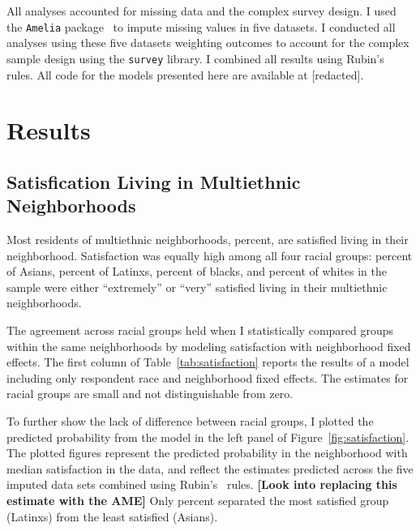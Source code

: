 \documentclass{baderart}
\begin{document}
All analyses accounted for missing data and the complex survey design. I used the \texttt{Amelia} package~\citep{honaker_amelia_2011} to impute missing values in five datasets. I conducted all analyses using these five datasets weighting outcomes to account for the complex sample design using the \texttt{survey} library. I combined all results using Rubin's~\citeyearpar{rubin_multiple_2004} rules. All code for the models presented here are available at [redacted].

\section{Results}\label{results}

\subsection{Satisfication Living in Multiethnic Neighborhoods}\label{satisfication-living-in-multiethnic-neighborhoods}

Most residents of multiethnic neighborhoods, \meansatisfied percent, are satisfied living in their neighborhood. Satisfaction was equally high among all four racial groups: \apisatisfied percent of Asians, \hspsatisfied percent of Latinxs, \nhbsatisfied percent of blacks, and \nhwsatisfied percent of whites in the sample were either ``extremely'' or ``very'' satisfied living in their multiethnic neighborhoods.

The agreement across racial groups held when I statistically compared groups within the same neighborhoods by modeling satisfaction with neighborhood fixed effects. The first column of Table~\ref{tab:satisfaction} reports the results of a model including only respondent race and neighborhood fixed effects. The estimates for racial groups are small and not distinguishable from zero.



To further show the lack of difference between racial groups, I plotted the predicted probability from the model in the left panel of Figure~\ref{fig:satisfaction}. The plotted figures represent the predicted probability in the neighborhood with median satisfaction in the data, and reflect the estimates predicted across the five imputed data sets combined using Rubin's~\citep{rubin_multiple_2004} rules. \textbf{{[}Look into replacing this estimate with the AME{]}} Only \maxdiffone percent separated the most satisfied group (Latinxs) from the least satisfied (Asians).
\end{document}
